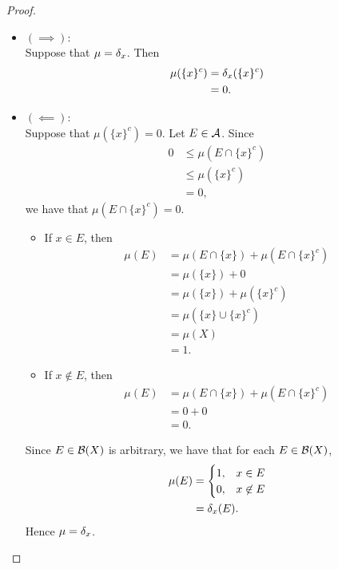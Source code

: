 \documentclass{book}
\begin{document}
\begin{proof}\
	\begin{itemize}
		\item $(\implies)$: \\
		Suppose that $\mu = \delta_x$. Then
		\begin{align*}
			\mu(\{x\}^c) 
			& = \delta_x(\{x\}^c) \\
			& = 0.
		\end{align*}
		\item $(\impliedby)$: \\
		Suppose that $\mu(\{x\}^c) = 0$. Let $E \in \mathcal{A}$. Since 
		\begin{align*}
			0
			& \leq \mu(E \cap \{x\}^c) \\
			& \leq \mu(\{x\}^c) \\
			& = 0,
		\end{align*}
		we have that $\mu(E \cap \{x\}^c) = 0$. 
		\begin{itemize}
			\item If $x \in E$, then 
			\begin{align*}
				\mu(E)
				& = \mu(E \cap \{x\}) + \mu(E \cap \{x\}^c) \\
				& = \mu(\{x\}) + 0 \\
				& = \mu(\{x\}) + \mu(\{x\}^c) \\
				& =  \mu(\{x\} \cup \{x\}^c) \\
				& = \mu(X) \\
				& = 1.
			\end{align*}
			\item If $x \not \in E$, then 
			\begin{align*}
				\mu(E)
				& = \mu(E \cap \{x\}) + \mu(E \cap \{x\}^c) \\
				& = 0 + 0 \\
				& = 0.
			\end{align*}
		\end{itemize}
		Since $E \in \mathcal{B}(X)$ is arbitrary, we have that for each $E \in \mathcal{B}(X)$, 
		\begin{align*}
			\mu(E)
			& = 
			\begin{cases}
				1, & x \in E \\
				0, & x \not \in E
			\end{cases}\\
			& = \delta_x(E).
		\end{align*}
		Hence $\mu = \delta_x$.
	\end{itemize}
\end{proof}
\end{document}
